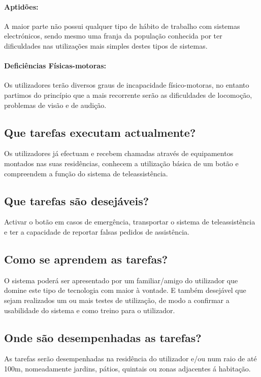 \paragraph{Aptidões:} A maior parte não possui qualquer tipo de hábito de trabalho com sistemas electrónicos, sendo mesmo uma franja da população conhecida por ter dificuldades nas utilizações mais simples destes tipos de sistemas.

\paragraph{Deficiências Físicas-motoras:} Os utilizadores terão diversos graus de incapacidade físico-motoras, no entanto partimos do princípio que a mais recorrente serão as dificuldades de locomoção, problemas de visão e de audição.


\subsection{Que tarefas executam actualmente?}
Os utilizadores já efectuam e recebem chamadas através de equipamentos montados nas suas residências, conhecem a utilização básica de um botão e compreendem a função do sistema de teleassistência.

\subsection{Que tarefas são desejáveis?}
Activar o botão em casos de emergência, transportar o sistema de teleassistência e ter a capacidade de reportar falsas pedidos de assistência.

\subsection{Como se aprendem as tarefas?}
O sistema poderá ser apresentado por um familiar/amigo do utilizador que domine este tipo de tecnologia com maior à vontade. E também desejável que sejam realizados um ou mais testes de utilização, de modo a confirmar a usabilidade do sistema e como treino para o utilizador.

\subsection{Onde são desempenhadas as tarefas?}
As tarefas serão desempenhadas na residência do utilizador e/ou num raio de até 100m, nomeadamente jardins, pátios, quintais ou zonas adjacentes á habitação.

